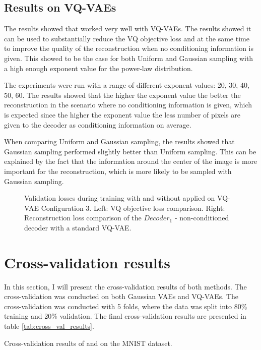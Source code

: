 \subsection{Results on VQ-VAEs}

The results showed that  worked very well with VQ-VAEs. The results showed it can be used to substantially reduce the VQ objective loss and at the same time to improve the quality of the reconstruction when no conditioning information is given. This showed to be the case for both Uniform and Gaussian sampling with a high enough exponent value for the power-law distribution.

The experiments were run with a range of different exponent values: 20, 30, 40, 50, 60. The results showed that the higher the exponent value the better the reconstruction in the scenario where no conditioning information is given, which is expected since the higher the exponent value the less number of pixels are given to the decoder as conditioning information on average.

When comparing Uniform and Gaussian sampling, the results showed that Gaussian sampling performed slightly better than Uniform sampling. This can be explained by the fact that the information around the center of the image is more important for the reconstruction, which is more likely to be sampled with Gaussian sampling.

\begin{figure}[H]
    \centering
    \scalebox{0.48}{}
    \scalebox{0.48}{}
    \caption[Validation loss comparison during training of a VQ-VAE.]
    {
        Validation losses during training with and without  applied on VQ-VAE Configuration 3.
        Left: VQ objective loss comparison. Right: Reconstruction loss comparison of the $Decoder_1$ - non-conditioned decoder with a standard VQ-VAE.
    }
    \label{fig:results_method2_vq_vae}
\end{figure}

\section{Cross-validation results}

In this section, I will present the cross-validation results of both methods. The cross-validation was conducted on both Gaussian VAEs and VQ-VAEs. The cross-validation was conducted with 5 folds, where the data was split into 80\% training and 20\% validation.
The final cross-validation results are presented in table \ref{tab:cross_val_results}.

\begin{table}
    
    \caption{Cross-validation results of  and  on the MNIST dataset.}
    \label{tab:cross_val_results}
\end{table}